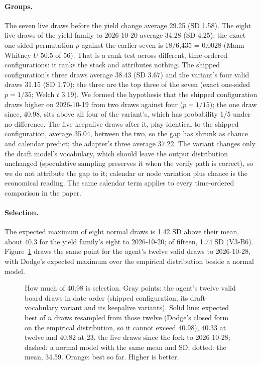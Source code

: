 \paragraph{Groups.}
The seven live draws before the yield change average 29.25 (SD 1.58). %
The eight live draws of the yield family to 2026-10-20 average 34.28 (SD 4.25); the exact one-sided permutation $p$ against the earlier seven is 18/6,435 = 0.0028 (Mann-Whitney $U$ 50.5 of 56). %
That is a rank test across different, time-ordered configurations: it ranks the stack and attributes nothing. %
The shipped configuration's three draws average 38.43 (SD 3.67) and the variant's four valid draws 31.15 (SD 1.70); the three are the top three of the seven (exact one-sided $p = 1/35$; Welch $t$ 3.19). %
We formed the hypothesis that the shipped configuration draws higher on 2026-10-19 from two draws against four ($p = 1/15$); the one draw since, 40.98, sits above all four of the variant's, which has probability 1/5 under no difference. %
The five keepalive draws after it, play-identical to the shipped configuration, average 35.04, between the two, so the gap has shrunk as chance and calendar predict; the adapter's three average 37.22. %
The variant changes only the draft model's vocabulary, which should leave the output distribution unchanged (speculative sampling preserves it when the verify path is correct), so we do not attribute the gap to it; calendar or node variation plus chance is the economical reading. The same calendar term applies to every time-ordered comparison in the paper. %

\paragraph{Selection.}
The expected maximum of eight normal draws is 1.42 SD above their mean, about 40.3 for the yield family's eight to 2026-10-20; of fifteen, 1.74 SD (V3-B6). %
Figure~\ref{fig:selection} draws the same point for the agent's twelve valid draws to 2026-10-28, with Dodge's expected maximum over the empirical distribution \citep{dodge2019showyourwork} beside a normal model. %

\begin{figure}[!htb]
\centering
{}
\caption{How much of 40.98 is selection. Gray points: the agent's twelve valid board draws in date order (shipped configuration, its draft-vocabulary variant and its keepalive variants). Solid line: expected best of $n$ draws resampled from those twelve (Dodge's closed form on the empirical distribution, so it cannot exceed 40.98), 40.33 at twelve and 40.82 at 23, the live draws since the fork to 2026-10-28; dashed: a normal model with the same mean and SD; dotted: the mean, 34.59. Orange: best so far. Higher is better.}\label{fig:selection} %
\end{figure}

